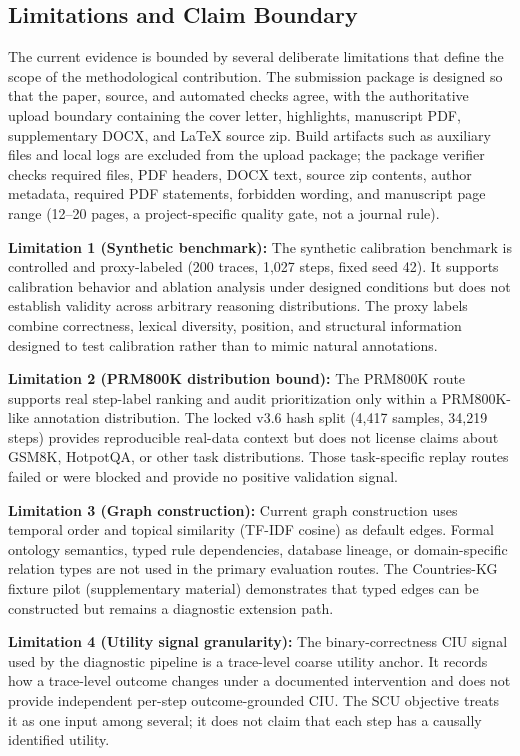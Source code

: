 \documentclass[a4paper,fleqn]{cas-sc}
\begin{document}
\subsection{Limitations and Claim Boundary}

The current evidence is bounded by several deliberate limitations that define the scope of the methodological contribution. The submission package is designed so that the paper, source, and automated checks agree, with the authoritative upload boundary containing the cover letter, highlights, manuscript PDF, supplementary DOCX, and LaTeX source zip. Build artifacts such as auxiliary files and local logs are excluded from the upload package; the package verifier checks required files, PDF headers, DOCX text, source zip contents, author metadata, required PDF statements, forbidden wording, and manuscript page range (12--20 pages, a project-specific quality gate, not a journal rule).

\medskip
\noindent\textbf{Limitation 1 (Synthetic benchmark):} The synthetic calibration benchmark is controlled and proxy-labeled (200 traces, 1,027 steps, fixed seed 42). It supports calibration behavior and ablation analysis under designed conditions but does not establish validity across arbitrary reasoning distributions. The proxy labels combine correctness, lexical diversity, position, and structural information designed to test calibration rather than to mimic natural annotations.

\textbf{Limitation 2 (PRM800K distribution bound):} The PRM800K route supports real step-label ranking and audit prioritization only within a PRM800K-like annotation distribution. The locked v3.6 hash split (4,417 samples, 34,219 steps) provides reproducible real-data context but does not license claims about GSM8K, HotpotQA, or other task distributions. Those task-specific replay routes failed or were blocked and provide no positive validation signal.

\textbf{Limitation 3 (Graph construction):} Current graph construction uses temporal order and topical similarity (TF-IDF cosine) as default edges. Formal ontology semantics, typed rule dependencies, database lineage, or domain-specific relation types are not used in the primary evaluation routes. The Countries-KG fixture pilot (supplementary material) demonstrates that typed edges can be constructed but remains a diagnostic extension path.

\textbf{Limitation 4 (Utility signal granularity):} The binary-correctness CIU signal used by the diagnostic pipeline is a trace-level coarse utility anchor. It records how a trace-level outcome changes under a documented intervention and does not provide independent per-step outcome-grounded CIU. The SCU objective treats it as one input among several; it does not claim that each step has a causally identified utility.
\end{document}

